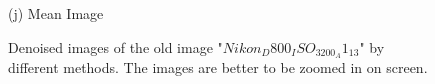 \documentclass[10pt,twocolumn,letterpaper]{article}
\begin{document}
\begin{figure}
{\begin{minipage}[t]{0.2\textwidth}
{\footnotesize (j) Mean Image }
\end{minipage}
}
\caption{Denoised images of the old image "$Nikon_D800_ISO_3200_A1_13$" by different methods. The images are better to be zoomed in on screen.}
\label{fig2}
\end{figure}

\begin{figure}
\centering
{}
\end{figure}
\end{document}
